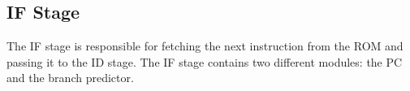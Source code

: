 \subsection{IF Stage}
The IF stage is responsible for fetching the next instruction from the ROM and passing it to the ID stage. 
The IF stage contains two different modules: the PC and the branch predictor.